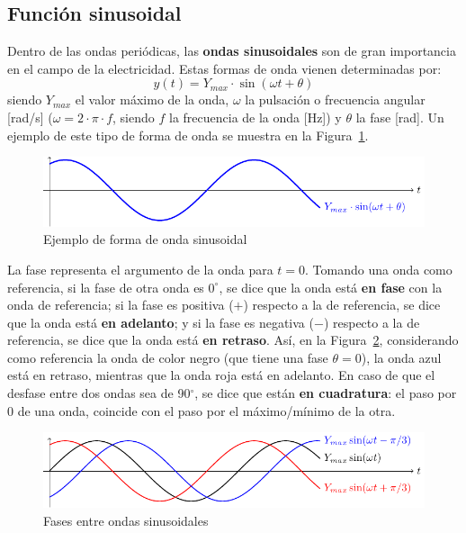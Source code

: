 \documentclass[11pt]{book} %
\begin{document}
	\subsection{Función sinusoidal}\label{sec.sinusoidal}
	Dentro de las ondas periódicas, las \textbf{ondas sinusoidales} son de gran importancia en el campo de la electricidad. Estas formas de onda vienen determinadas por:
	\begin{equation}\label{eq.y_senoidal}
		\boxed{y(t)=Y_{max}\cdot\sin(\omega t+\theta)} 
	\end{equation}
	siendo $Y_{max}$ el valor máximo de la onda, $\omega$ la pulsación o frecuencia angular [rad/s] ($\omega=2\cdot\pi\cdot f$, siendo $f$ la frecuencia de la onda [Hz]) y $\theta$ la fase [rad]. Un ejemplo de este tipo de forma de onda se muestra en la Figura~\ref{fig.sin}.
	\begin{figure}[htbp]
		\centering
		\includegraphics[width=.9\linewidth]{../figs/sin.pdf}
		\caption{Ejemplo de forma de onda sinusoidal}
		\label{fig.sin}
	\end{figure}
	
	La fase representa el argumento de la onda para $t=0$. Tomando una onda como referencia, si la fase de otra onda es $0^\circ$, se dice que la onda está \textbf{en fase} con la onda de referencia; si la fase es positiva ($+$) respecto a la de referencia, se dice que la onda está \textbf{en adelanto}; y si la fase es negativa ($-$) respecto a la de referencia, se dice que la onda está \textbf{en retraso}. Así, en la Figura~\ref{fig.desfase}, considerando como referencia la onda de color negro (que tiene una fase $\theta=0$), la {\color{blue} onda azul} está en retraso, mientras que la {\color{red} onda roja} está en adelanto. En caso de que el desfase entre dos ondas sea de 90$^\circ$, se dice que están \textbf{en cuadratura}: el paso por 0 de una onda, coincide con el paso por el máximo/mínimo de la otra.
	\begin{figure}[htbp]
		\centering
		\includegraphics[width=.9\linewidth]{../figs/desfase.pdf}
		\caption{Fases entre ondas sinusoidales}
		\label{fig.desfase}
	\end{figure}
	
\end{document}
